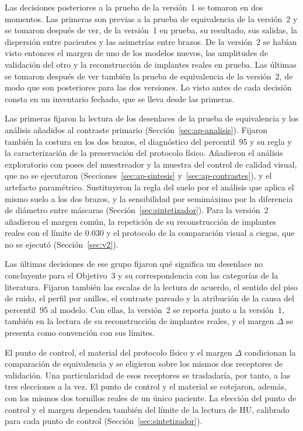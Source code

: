 Las decisiones posteriores a la prueba de la versión~1 se tomaron en dos momentos. Las primeras son previas a la prueba de equivalencia de la versión~2 y se tomaron después de ver, de la versión~1 en prueba, su resultado, sus salidas, la dispersión entre pacientes y las asimetrías entre brazos. De la versión~2 se habían visto entonces el margen de uno de los modelos nuevos, las amplitudes de validación del otro y la reconstrucción de implantes reales en prueba. Las últimas se tomaron después de ver también la prueba de equivalencia de la versión~2, de modo que son posteriores para las dos versiones. Lo visto antes de cada decisión consta en un inventario fechado, que se lleva desde las primeras.

Las primeras fijaron la lectura de los desenlaces de la prueba de equivalencia y los análisis añadidos al contraste primario (Sección~\ref{sec:ap-analisis}). Fijaron también la costura en los dos brazos, el diagnóstico del percentil~95 y su regla y la caracterización de la preservación del protocolo físico. Añadieron el análisis exploratorio con poses del muestreador y la muestra del control de calidad visual, que no se ejecutaron (Secciones~\ref{sec:ap-sintesis} y~\ref{sec:ap-contrastes}), y el artefacto paramétrico. Sustituyeron la regla del suelo por el análisis que aplica el mismo suelo a los dos brazos, y la sensibilidad por semimáximo por la diferencia de diámetro entre máscaras (Sección~\ref{sec:sintetizador}). Para la versión~2 añadieron el margen común, la repetición de su reconstrucción de implantes reales con el límite de 0.030 y el protocolo de la comparación visual a ciegas, que no se ejecutó (Sección~\ref{sec:v2}).

Las últimas decisiones de ese grupo fijaron qué significa un desenlace no concluyente para el Objetivo~3 y su correspondencia con las categorías de la literatura. Fijaron también las escalas de la lectura de acuerdo, el sentido del piso de ruido, el perfil por anillos, el contraste pareado y la atribución de la causa del percentil~95 al modelo. Con ellas, la versión~2 se reporta junto a la versión~1, también en la lectura de su reconstrucción de implantes reales, y el margen $\Delta$ se presenta como convención con sus límites.

El punto de control, el material del protocolo físico y el margen $\Delta$ condicionan la comparación de equivalencia y se eligieron sobre los mismos dos receptores de validación. Una particularidad de esos receptores se trasladaría, por tanto, a las tres elecciones a la vez. El punto de control y el material se cotejaron, además, con los mismos dos tornillos reales de un único paciente. La elección del punto de control y el margen dependen también del límite de la lectura de HU, calibrado para cada punto de control (Sección~\ref{sec:sintetizador}).

